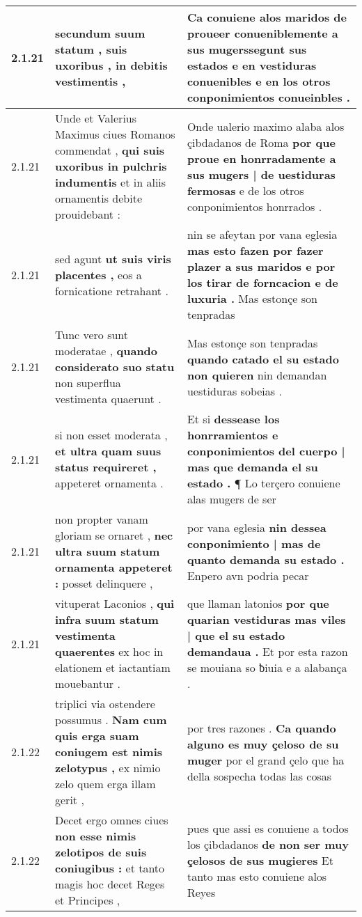 \begin{tabular}{|p{1cm}|p{6.5cm}|p{6.5cm}|}
2.1.21 & secundum suum statum , \textbf{ suis uxoribus , } in debitis vestimentis , & Ca conuiene alos maridos de proueer conueniblemente a sus \textbf{ mugerssegunt sus estados e en vestiduras conuenibles } e en los otros conponimientos conueinbles . \\\hline
2.1.21 & Unde et Valerius Maximus ciues Romanos commendat , \textbf{ qui suis uxoribus in pulchris indumentis } et in aliis ornamentis debite prouidebant : & Onde ualerio maximo alaba alos çibdadanos de Roma \textbf{ por que proue en honrradamente a sus mugers | de uestiduras fermosas } e de los otros conponimientos honrrados . \\\hline
2.1.21 & sed agunt \textbf{ ut suis viris placentes , } eos a fornicatione retrahant . & nin se afeytan por vana eglesia \textbf{ mas esto fazen por fazer plazer a sus maridos e por los tirar de forncacion e de luxuria . } Mas estonçe son tenpradas \\\hline
2.1.21 & Tunc vero sunt moderatae , \textbf{ quando considerato suo statu } non superflua vestimenta quaerunt . & Mas estonçe son tenpradas \textbf{ quando catado el su estado non quieren } nin demandan uestiduras sobeias . \\\hline
2.1.21 & si non esset moderata , \textbf{ et ultra quam suus status requireret , } appeteret ornamenta . & Et si \textbf{ dessease los honrramientos e conponimientos del cuerpo | mas que demanda el su estado . } ¶ Lo terçero conuiene alas mugers de ser \\\hline
2.1.21 & non propter vanam gloriam se ornaret , \textbf{ nec ultra suum statum ornamenta appeteret : } posset delinquere , & por vana eglesia \textbf{ nin dessea conponimiento | mas de quanto demanda su estado . } Enpero avn podria pecar \\\hline
2.1.21 & vituperat Laconios , \textbf{ qui infra suum statum vestimenta quaerentes } ex hoc in elationem et iactantiam mouebantur . & que llaman latonios \textbf{ por que quarian vestiduras mas viles | que el su estado demandaua . } Et por esta razon se mouiana so ƀiuia e a alabança . \\\hline
2.1.22 & triplici via ostendere possumus . \textbf{ Nam cum quis erga suam coniugem est nimis zelotypus , } ex nimio zelo quem erga illam gerit , & por tres razones . \textbf{ Ca quando alguno es muy çeloso de su muger } por el grand çelo que ha della sospecha todas las cosas \\\hline
2.1.22 & Decet ergo omnes ciues \textbf{ non esse nimis zelotipos de suis coniugibus : } et tanto magis hoc decet Reges et Principes , & pues que assi es conuiene a todos los çibdadanos \textbf{ de non ser muy çelosos de sus mugieres } Et tanto mas esto conuiene alos Reyes \\\hline

\end{tabular}
